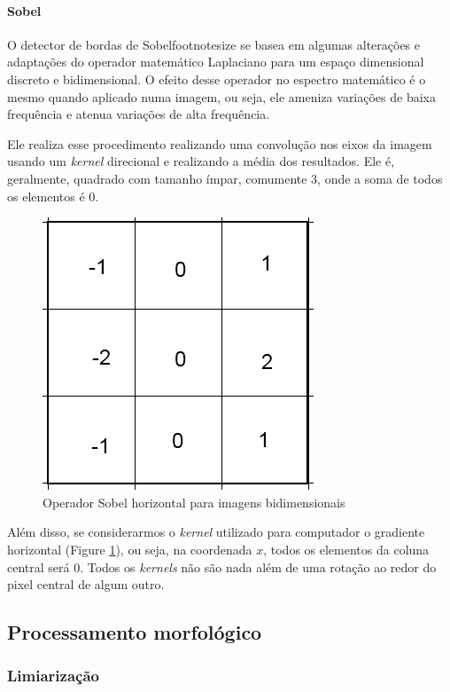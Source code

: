\documentclass[10pt,twocolumn,letterpaper]{article}
\begin{document}
\paragraph{Sobel}
	O detector de bordas de Sobel{footnotesize \cite{sobel1}} se basea em algumas
alterações e adaptações do operador matemático Laplaciano{\footnotesize \cite{laplace1}}
para um espaço dimensional discreto e bidimensional{\footnotesize \cite{laplace2}}. O
efeito desse operador no espectro matemático é o mesmo quando aplicado numa imagem,
ou seja, ele ameniza variações de baixa frequência e atenua variações de alta frequência.{\footnotesize \cite{sobel2}}

	Ele realiza esse procedimento realizando uma convolução nos eixos da imagem
usando um \emph{kernel} direcional e realizando a média dos resultados. Ele é,
geralmente, quadrado com tamanho ímpar, comumente 3, onde a soma de todos
os elementos é 0.


\begin{figure}[!htp]
\centering
\includegraphics[width=0.5\columnwidth]{SobelGx}
\caption{Operador Sobel horizontal para imagens bidimensionais}
\label{fig:SobelGx}
\end{figure}

Além disso, se considerarmos o \emph{kernel} utilizado para computador o gradiente
horizontal (Figure \ref{fig:SobelGx}), ou seja, na coordenada $x$, todos os elementos
da coluna central será 0. Todos os \emph{kernels} não são nada além de uma rotação
ao redor do pixel central de algum outro.

\subsection{Processamento morfológico}

\subsubsection{Limiarização}
\end{document}
